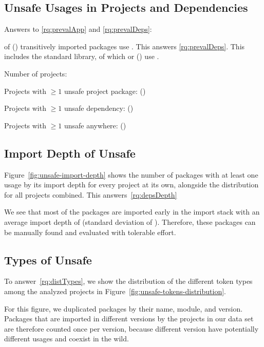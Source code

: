 

\subsection{Unsafe Usages in Projects and Dependencies}

Answers to \ref{rq:prevalApp} and \ref{rq:prevalDeps}:

 of  () transitively imported packages use \unsafe{}. This answers \ref{rq:prevalDeps}. This includes the standard library, of which  or  () use \unsafe{}.

Number of projects: 

Projects with $\geq 1$ unsafe project package:  ()

Projects with $\geq 1$ unsafe dependency:  ()

Projects with $\geq 1$ unsafe anywhere:  ()


\subsection{Import Depth of Unsafe}

Figure~\ref{fig:unsafe-import-depth} shows the number of packages with at least one \unsafe{} usage by its import depth for every project at its own, alongside the distribution for all projects combined. This answers~\ref{rq:depsDepth}

We see that most of the packages are imported early in the import stack with an average import depth of \averageUnsafeImportDepth (standard deviation of \stdUnsafeImportDepth).
Therefore, these packages can be manually found and evaluated with tolerable effort.




\subsection{Types of Unsafe}

To answer~\ref{rq:distTypes}, we show the distribution of the different \unsafe{} token types among the analyzed projects in Figure~\ref{fig:unsafe-tokens-distribution}.

For this figure, we duplicated packages by their name, module, and version. Packages that are imported in different versions by the projects in our data set are therefore counted once per version, because different version have potentially different \unsafe{} usages and coexist in the wild.


